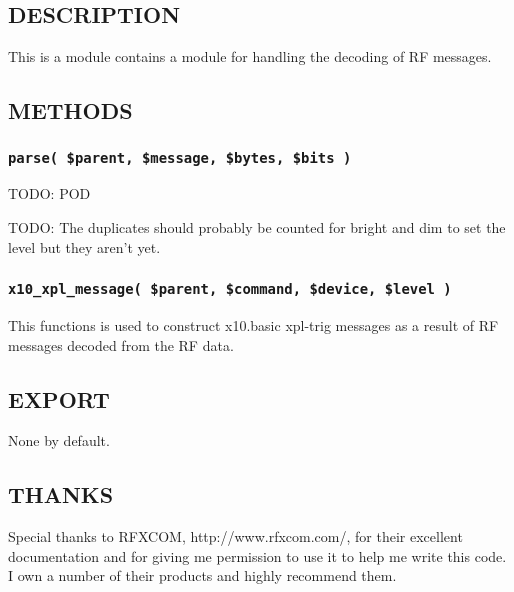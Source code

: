 \documentclass[12pt,a4paper]{article}
\begin{document}
\subsection*{DESCRIPTION\label{xPL::RF::X10_DESCRIPTION}}


This is a module contains a module for handling the decoding of RF
messages.

\subsection*{METHODS\label{xPL::RF::X10_METHODS}}
\subsubsection*{\texttt{parse( \$parent, \$message, \$bytes, \$bits )}\label{xPL::RF::X10_parse_parent_message_bytes_bits_}}


TODO: POD



TODO: The duplicates should probably be counted for bright and dim to set
the level but they aren't yet.

\subsubsection*{\texttt{x10\_xpl\_message( \$parent, \$command, \$device, \$level )}\label{xPL::RF::X10_x10_xpl_message_parent_command_device_level_}}


This functions is used to construct x10.basic xpl-trig messages as a
result of RF messages decoded from the RF data.

\subsection*{EXPORT\label{xPL::RF::X10_EXPORT}}


None by default.

\subsection*{THANKS\label{xPL::RF::X10_THANKS}}


Special thanks to RFXCOM, \textsf{http://www.rfxcom.com/}, for their
excellent documentation and for giving me permission to use it to help
me write this code.  I own a number of their products and highly
recommend them.
\end{document}
